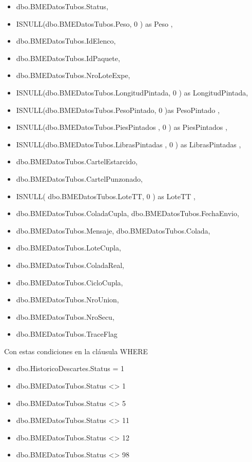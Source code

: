 \documentclass[]{article}
\begin{document}
\begin{itemize}[label=\textcolor{blue}{\textbullet}]
	\item dbo.BMEDatosTubos.Status, 
	\item ISNULL(dbo.BMEDatosTubos.Peso, 0 ) as Peso , 
	\item dbo.BMEDatosTubos.IdElenco, 
	\item dbo.BMEDatosTubos.IdPaquete, 
	\item dbo.BMEDatosTubos.NroLoteExpe, 
	\item ISNULL(dbo.BMEDatosTubos.LongitudPintada, 0 ) as LongitudPintada, 
	\item ISNULL(dbo.BMEDatosTubos.PesoPintado, 0 )as PesoPintado , 
	\item ISNULL(dbo.BMEDatosTubos.PiesPintados , 0 ) as PiesPintados , 
	\item ISNULL(dbo.BMEDatosTubos.LibrasPintadas , 0 ) as LibrasPintadas , \item dbo.BMEDatosTubos.CartelEstarcido, 
	\item dbo.BMEDatosTubos.CartelPunzonado, 
	\item ISNULL( dbo.BMEDatosTubos.LoteTT, 0 ) as LoteTT , 
	\item dbo.BMEDatosTubos.ColadaCupla, dbo.BMEDatosTubos.FechaEnvio, 
	\item dbo.BMEDatosTubos.Mensaje, dbo.BMEDatosTubos.Colada, 
	\item dbo.BMEDatosTubos.LoteCupla, 
	\item dbo.BMEDatosTubos.ColadaReal, 
	\item dbo.BMEDatosTubos.CicloCupla, 
	\item dbo.BMEDatosTubos.NroUnion, 
	\item dbo.BMEDatosTubos.NroSecu, 
	\item dbo.BMEDatosTubos.TraceFlag
\end{itemize}

\par Con estas condiciones en la cláusula WHERE

\begin{itemize}[label=\textcolor{blue}{\textbullet}]
	\item dbo.HistoricoDescartes.Status = 1
	\item dbo.BMEDatosTubos.Status <> 1
	\item dbo.BMEDatosTubos.Status <> 5
	\item dbo.BMEDatosTubos.Status <> 11
	\item dbo.BMEDatosTubos.Status <> 12
	\item dbo.BMEDatosTubos.Status <> 98
\end{itemize}
\end{document}
